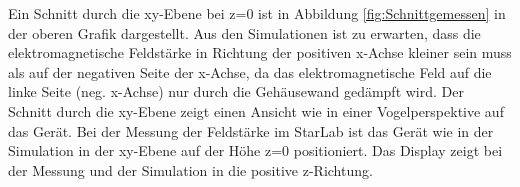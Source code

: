 \newpage
Ein Schnitt durch die xy-Ebene bei z=0 ist in Abbildung \ref{fig:Schnittgemessen} in der oberen Grafik dargestellt. Aus den Simulationen ist zu erwarten, dass die elektromagnetische Feldstärke in Richtung der positiven x-Achse kleiner sein muss als auf der negativen Seite der x-Achse, da das elektromagnetische Feld auf die linke Seite (neg. x-Achse) nur durch die Gehäusewand gedämpft wird. Der Schnitt durch die xy-Ebene zeigt einen Ansicht wie in einer Vogelperspektive auf das Gerät. Bei der Messung der Feldstärke im StarLab ist das Gerät wie in der Simulation in der xy-Ebene auf der Höhe z=0 positioniert. Das Display zeigt bei der Messung und der Simulation in die positive z-Richtung.    \\
%	

